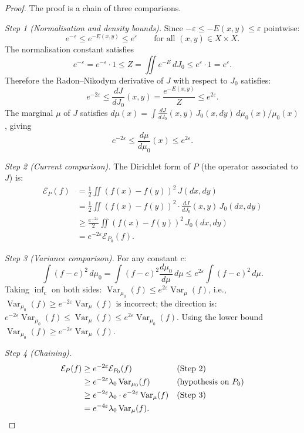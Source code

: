 \documentclass[12pt]{article}
\theoremstyle{plain}
\theoremstyle{definition}
\numberwithin{equation}{section}
\newcommand{\Var}{\operatorname{Var}}
\begin{document}
\begin{proof}
The proof is a chain of three comparisons.

\emph{Step 1 (Normalisation and density bounds).}
Since $-\varepsilon\leq -E(x,y)\leq\varepsilon$ pointwise:
\begin{equation}
e^{-\varepsilon}\leq e^{-E(x,y)}\leq e^\varepsilon\qquad\text{for all }(x,y)\in X\times X.
\end{equation}
The normalisation constant satisfies
\begin{equation}
e^{-\varepsilon} = e^{-\varepsilon}\cdot 1 \leq Z = \iint e^{-E}\,dJ_0 \leq e^\varepsilon\cdot 1 = e^\varepsilon.
\end{equation}
Therefore the Radon--Nikodym derivative of $J$ with respect to $J_0$ satisfies:
\begin{equation}
e^{-2\varepsilon} \leq \frac{dJ}{dJ_0}(x,y) = \frac{e^{-E(x,y)}}{Z} \leq e^{2\varepsilon}.
\end{equation}
The marginal $\mu$ of $J$ satisfies $d\mu(x)=\int\frac{dJ}{dJ_0}(x,y)\,J_0(x,dy)\,d\mu_0(x)/\mu_0(x)$, giving
\begin{equation}
e^{-2\varepsilon} \leq \frac{d\mu}{d\mu_0}(x) \leq e^{2\varepsilon}.
\end{equation}

\emph{Step 2 (Current comparison).}
The Dirichlet form of $P$ (the operator associated to $J$) is:
\begin{align}
\mathcal{E}_P(f) &= \frac{1}{2}\iint(f(x)-f(y))^2\,J(dx,dy)\\
&= \frac{1}{2}\iint(f(x)-f(y))^2\cdot\frac{dJ}{dJ_0}(x,y)\,J_0(dx,dy)\\
&\geq \frac{e^{-2\varepsilon}}{2}\iint(f(x)-f(y))^2\,J_0(dx,dy)\\
&= e^{-2\varepsilon}\mathcal{E}_{P_0}(f).
\end{align}

\emph{Step 3 (Variance comparison).}
For any constant $c$:
\begin{equation}
\int(f-c)^2\,d\mu_0 = \int(f-c)^2\frac{d\mu_0}{d\mu}\,d\mu \leq e^{2\varepsilon}\int(f-c)^2\,d\mu.
\end{equation}
Taking $\inf_c$ on both sides: $\Var_{\mu_0}(f)\leq e^{2\varepsilon}\Var_\mu(f)$, i.e., $\Var_{\mu_0}(f)\geq e^{-2\varepsilon}\Var_\mu(f)$ is incorrect; the direction is: $e^{-2\varepsilon}\Var_{\mu_0}(f)\leq\Var_\mu(f)\leq e^{2\varepsilon}\Var_{\mu_0}(f)$.  Using the lower bound $\Var_{\mu_0}(f)\geq e^{-2\varepsilon}\Var_\mu(f)$.

\emph{Step 4 (Chaining).}
\begin{align}
\mathcal{E}_P(f) &\geq e^{-2\varepsilon}\mathcal{E}_{P_0}(f) &&\text{(Step 2)}\\
&\geq e^{-2\varepsilon}\lambda_0\Var_{\mu_0}(f) &&\text{(hypothesis on }P_0\text{)}\\
&\geq e^{-2\varepsilon}\lambda_0\cdot e^{-2\varepsilon}\Var_\mu(f) &&\text{(Step 3)}\\
&= e^{-4\varepsilon}\lambda_0\Var_\mu(f). &&\qedhere
\end{align}
\end{proof}
\end{document}
